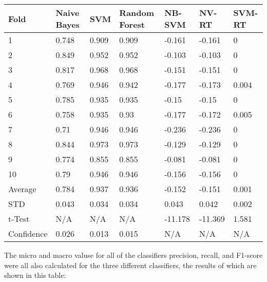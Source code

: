 \documentclass[11pt]{article}
\begin{document}
\begin{center}
\begin{longtable}{| l | l | l | l | l | l | l |}
\hline
Fold       & Naive Bayes & SVM   & Random Forest & NB-SVM  & NV-RT   & SVM-RT \\
\hline
1          & 0.748       & 0.909 & 0.909         & -0.161  & -0.161  & 0      \\
2          & 0.849       & 0.952 & 0.952         & -0.103  & -0.103  & 0      \\
3          & 0.817       & 0.968 & 0.968         & -0.151  & -0.151  & 0      \\
4          & 0.769       & 0.946 & 0.942         & -0.177  & -0.173  & 0.004  \\
5          & 0.785       & 0.935 & 0.935         & -0.15   & -0.15   & 0      \\
6          & 0.758       & 0.935 & 0.93          & -0.177  & -0.172  & 0.005  \\
7          & 0.71        & 0.946 & 0.946         & -0.236  & -0.236  & 0      \\
8          & 0.844       & 0.973 & 0.973         & -0.129  & -0.129  & 0      \\
9          & 0.774       & 0.855 & 0.855         & -0.081  & -0.081  & 0      \\
10         & 0.79        & 0.946 & 0.946         & -0.156  & -0.156  & 0      \\
\hline
Average    & 0.784       & 0.937 & 0.936         & -0.152  & -0.151  & 0.001  \\
STD        & 0.043       & 0.034 & 0.034         & 0.043   & 0.042   & 0.002  \\
t-Test     & N/A         & N/A   & N/A           & -11.178 & -11.369 & 1.581  \\
\hline
Confidence & 0.026       & 0.013 & 0.015         & N/A     & N/A     & N/A    \\
\hline
\end{longtable}
\end{center}

The micro and macro valuse for all of the classifiers precision, recall, and F1-score were all also calculated for the three different classifiers, the results of which are shown in this table:
\end{document}
